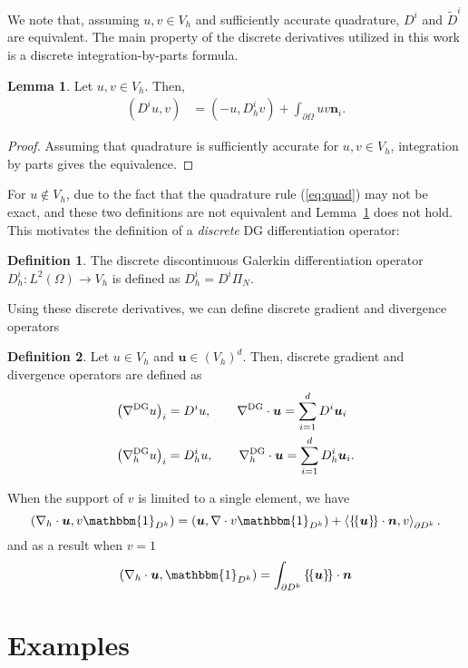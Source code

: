 \documentclass[preprint,10pt]{article}
\theoremstyle{definition}
\newtheorem{definition}{Definition}
\theoremstyle{lemma}
\newtheorem{lemma}{Lemma}
\newcommand{\bbm}[1]{\mathbbm{#1}}
\newcommand{\LRp}[1]{\left( #1 \right)}
\newcommand{\LRa}[1]{\left\langle #1 \right\rangle}
\newcommand{\LRc}[1]{\left\{ #1 \right\}}
\newcommand{\Grad} {\ensuremath{\nabla}}
\newcommand{\avg}[1] {\ensuremath{\LRc{\!\{#1\}\!}}}
\begin{document}
We note that, assuming $u,v \in V_h$ and sufficiently accurate quadrature, $D^i$ and $\tilde{D}^i$ are equivalent.  The main property of the discrete derivatives utilized in this work is a discrete integration-by-parts formula.  
\begin{lemma}
Let $u,v\in V_h$.  Then, 
\begin{align*}
\LRp{D^i u,v} &= \LRp{-u,D^i_h v} + \int_{\partial \Omega} uv \bm{n}_i.
\end{align*}
\label{lemma:ibp}
\end{lemma}
\begin{proof}
Assuming that quadrature is sufficiently accurate for $u, v\in V_h$, integration by parts gives the equivalence. 
\end{proof}

For $u \not\in V_h$, due to the fact that the quadrature rule (\ref{eq:quad}) may not be exact, and these two definitions are not equivalent and Lemma~\ref{lemma:ibp} does not hold.  This motivates the definition of a \textit{discrete} DG differentiation operator:
\begin{definition}
The discrete discontinuous Galerkin differentiation operator ${D}^i_h: L^2\LRp{\Omega} \rightarrow V_h$ is defined as $D^i_h = D^i \Pi_N$.
\end{definition}

Using these discrete derivatives, we can define discrete gradient and divergence operators
\begin{definition}
Let $u \in V_h$ and $\bm{u}\in \LRp{V_h}^d$.  Then, discrete gradient and divergence operators are defined as
\begin{align*}
\LRp{\Grad^{\rm DG} u}_i &= D^i u, \qquad \Grad^{\rm DG}\cdot \bm{u} = \sum_{i=1}^d D^i \bm{u}_i\\
\LRp{\Grad^{\rm DG}_h u}_i &= D_h^i u, \qquad \Grad^{\rm DG}_h\cdot \bm{u} = \sum_{i=1}^d D_h^i \bm{u}_i.
\end{align*}
\end{definition} 

When the support of $v$ is limited to a single element, we have
\[
\LRp{\Grad_h\cdot \bm{u},v\bbm{1}_{D^k}} = \LRp{\bm{u}, \Grad\cdot v\bbm{1}_{D^k}}  + \LRa{\avg{\bm{u}}\cdot\bm{n},v}_{\partial D^k}.
\]
and as a result when $v = 1$
\[
\LRp{\Grad_h\cdot \bm{u},\bbm{1}_{D^k}} = \int_{\partial D^k}\avg{\bm{u}}\cdot\bm{n}
\]

\section{Examples}
\end{document}
